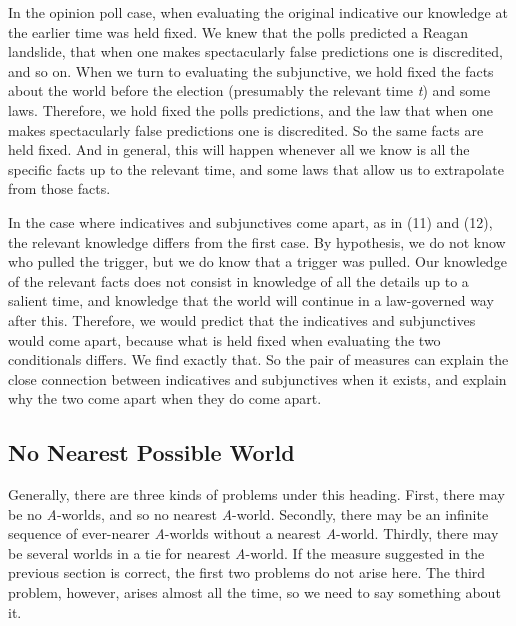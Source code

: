 \documentclass[
  11pt,
  letterpaper,
  DIV=11,
  numbers=noendperiod,
  twoside]{scrartcl}
\begin{document}
In the opinion poll case, when evaluating the original indicative our
knowledge at the earlier time was held fixed. We knew that the polls
predicted a Reagan landslide, that when one makes spectacularly false
predictions one is discredited, and so on. When we turn to evaluating
the subjunctive, we hold fixed the facts about the world before the
election (presumably the relevant time \emph{t}) and some laws.
Therefore, we hold fixed the polls predictions, and the law that when
one makes spectacularly false predictions one is discredited. So the
same facts are held fixed. And in general, this will happen whenever all
we know is all the specific facts up to the relevant time, and some laws
that allow us to extrapolate from those facts.

In the case where indicatives and subjunctives come apart, as in (11)
and (12), the relevant knowledge differs from the first case. By
hypothesis, we do not know who pulled the trigger, but we do know that a
trigger was pulled. Our knowledge of the relevant facts does not consist
in knowledge of all the details up to a salient time, and knowledge that
the world will continue in a law-governed way after this. Therefore, we
would predict that the indicatives and subjunctives would come apart,
because what is held fixed when evaluating the two conditionals differs.
We find exactly that. So the pair of measures can explain the close
connection between indicatives and subjunctives when it exists, and
explain why the two come apart when they do come apart.

\subsection{No Nearest Possible World}\label{no-nearest-possible-world}

Generally, there are three kinds of problems under this heading. First,
there may be no \emph{A}-worlds, and so no nearest \emph{A}-world.
Secondly, there may be an infinite sequence of ever-nearer
\emph{A}-worlds without a nearest \emph{A}-world. Thirdly, there may be
several worlds in a tie for nearest \emph{A}-world. If the measure
suggested in the previous section is correct, the first two problems do
not arise here. The third problem, however, arises almost all the time,
so we need to say something about it.
\end{document}

